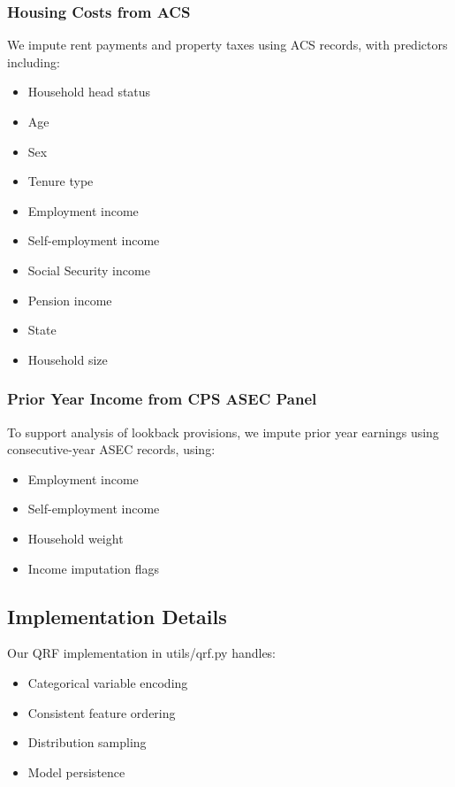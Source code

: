 \subsubsection{Housing Costs from ACS}
We impute rent payments and property taxes using ACS records, with predictors including:
\begin{itemize}
    \item Household head status
    \item Age
    \item Sex
    \item Tenure type
    \item Employment income
    \item Self-employment income
    \item Social Security income
    \item Pension income
    \item State
    \item Household size
\end{itemize}

\subsubsection{Prior Year Income from CPS ASEC Panel}
To support analysis of lookback provisions, we impute prior year earnings using consecutive-year ASEC records, using:
\begin{itemize}
    \item Employment income
    \item Self-employment income
    \item Household weight
    \item Income imputation flags
\end{itemize}

\subsection{Implementation Details}

Our QRF implementation in utils/qrf.py handles:
\begin{itemize}
    \item Categorical variable encoding
    \item Consistent feature ordering
    \item Distribution sampling
    \item Model persistence
\end{itemize}

